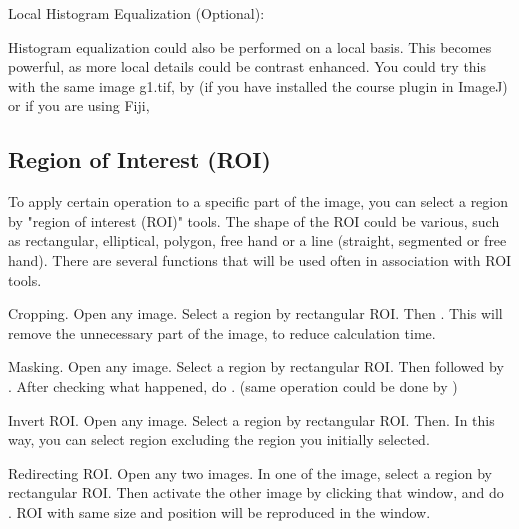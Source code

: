 \begin{indentexercise}{3}
Local Histogram Equalization (Optional):
\item Histogram equalization could also be performed on a local basis. This becomes
powerful, as more local details could be contrast enhanced. You could
try this with the same image g1.tif, by  
(if you have installed the course plugin in ImageJ) or if you are using Fiji, 
\end{indentexercise}



\subsection{Region of Interest (ROI) }
\label{subsec:roi}
To apply certain operation to a specific part of the image, you can
select a region by "region of interest
(ROI)" tools. The shape of the ROI could be various,
such as rectangular, elliptical, polygon, free hand or a line
(straight, segmented or free hand). There are several functions that
will be used often in association with ROI tools. 

\begin{indentexercise}{1}
Cropping. Open any image. Select a region by
rectangular ROI. Then . This will
remove the unnecessary part of the image, to reduce calculation time.
\end{indentexercise}

\begin{indentexercise}{2}
Masking. Open any image. Select a region by
rectangular ROI. Then  followed by
. After checking what
happened, do . (same operation could
be done by )
\end{indentexercise}

\begin{indentexercise}{3}
Invert ROI. Open any image. Select a region by
rectangular ROI. Then. In this way, you can select region
excluding the region you initially selected.
\end{indentexercise}

\begin{indentexercise}{4}
Redirecting ROI. Open any two images. In one
of the image, select a region by rectangular ROI. Then activate the
other image by clicking that window, and do . ROI with
same size and position will be reproduced in the window. 
\end{indentexercise}



